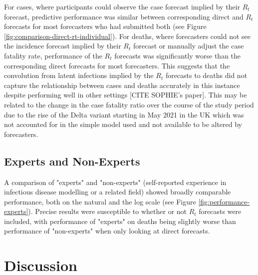 \documentclass[10pt,a4paper,twocolumn]{article}
\begin{document}
For cases, where participants could observe the case forecast implied by their $R_t$ forecast, predictive performance was similar between corresponding direct and $R_t$ forecasts for most forecasters who had submitted both (see Figure \ref{fig:comparison-direct-rt-individual}). For deaths, where forecasters could not see the incidence forecast implied by their $R_t$ forecast or manually adjust the case fatality rate, performance of the $R_t$ forecasts was significantly worse than the corresponding direct forecasts for most forecasters. This suggests that the convolution from latent infections implied by the $R_t$ forecasts to deaths did not capture the relationship between cases and deaths accurately in this instance despite performing well in other settings [CITE SOPHIE's paper]. This may be related to the change in the case fatality ratio over the course of the study period due to the rise of the Delta variant starting in May 2021 in the UK which was not accounted for in the simple model used and not available to be altered by forecasters.

\subsection*{Experts and Non-Experts}

A comparison of "experts" and "non-experts" (self-reported experience in infectious disease modelling or a related field) showed broadly comparable performance, both on the natural and the log scale (see Figure \ref{fig:performance-experts}). Precise results were susceptible to whether or not $R_t$ forecasts were included, with performance of "experts" on deaths being slightly worse than performance of "non-experts" when only looking at direct forecasts. 


\section*{Discussion}

\end{document}
